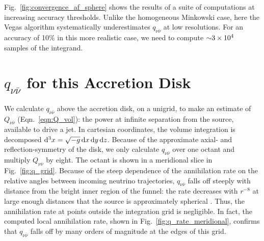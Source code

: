 Fig.~\ref{fig:convergence_af_sphere} shows the results of a suite of
computations at increasing accuracy thresholds.
Unlike the homogeneous Minkowski case, here the Vegas algorithm
systematically underestimates $q_{\nu\bar{\nu}}$ at low resolutions.
For an accuracy of 10\% in this more realistic case, we need to compute
$\mathord{\sim}3\times10^4$ samples of the integrand.

\section{$q_{\nu \bar{\nu}}$ for this Accretion Disk}
\label{sec:q_this_case}
We calculate $q_{\nu\bar{\nu}}$ above the accretion disk, on a unigrid, to make
an estimate of $Q_{\nu\bar{\nu}}$ (Eqn.~\ref{eqn:Q_vol}):
the power at infinite separation from the source, available to drive a jet.
In cartesian coordinates, the volume integration is decomposed
$\mathrm{d}^3 x=\sqrt{-g}\, \mathrm{d} x\,\mathrm{d} y\,\mathrm{d} z$.
Because of the approximate axial- and reflection-symmetry of the disk, we only
calculate $q_{\nu\bar{\nu}}$ over one octant and multiply $Q_{\nu\bar{\nu}}$ by
eight.
The octant is shown in a meridional slice in Fig.~\ref{fig:q_grid}.
Because of the steep dependence of the annihilation rate on the relative angles
between incoming neutrino trajectories, $q_{\nu\bar{\nu}}$ falls off steeply
with distance from the bright inner region of the funnel: the rate decreases with
$r^{-8}$ at large enough distances that the source is approximately spherical
\citep{seti2006-nunubar}.
Thus, the annihilation rate at points outside the integration grid is negligible.
In fact, the computed local annihilation rate, shown in
Fig.~\ref{fig:q_rate_meridional},
confirms that $q_{\nu\bar{\nu}}$ falls off by many orders of magnitude at the
edges of this grid.

